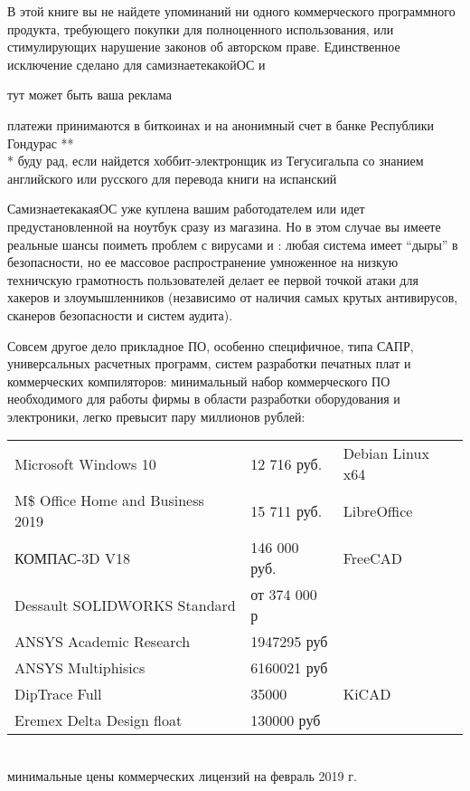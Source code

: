 \clearpage
{}

В этой книге вы не найдете упоминаний ни одного коммерческого программного
продукта, требующего покупки для полноценного использования, или
стимулирующих нарушение законов об авторском праве. Единственное исключение
сделано для самизнаетекакойОС и 
\begin{framed}
\begin{center}
тут может быть ваша реклама
\end{center}
{\tiny * платежи принимаются в биткоинах и на анонимный счет в банке
Республики Гондурас **}\\
{\tiny ** буду рад, если найдется хоббит-электронщик из Тегусигальпа со знанием
английского или русского для перевода книги на испанский}
\end{framed}

\clearpage\noindent
СамизнаетекакаяОС уже куплена вашим работодателем
или идет предустановленной на ноутбук сразу из магазина. Но в этом случае вы
имеете реальные шансы поиметь проблем с вирусами и : любая система
имеет ``дыры'' в безопасности, но ее массовое распространение умноженное на
низкую техничскую грамотность пользователей делает ее первой точкой атаки для
хакеров и злоумышленников (независимо от наличия самых крутых
антивирусов, сканеров безопасности и систем аудита).

Совсем другое дело прикладное ПО, особенно специфичное, типа САПР, универсальных
расчетных программ, систем разработки печатных плат и коммерческих компиляторов:
минимальный набор коммерческого ПО необходимого для работы фирмы в области
разработки оборудования и электроники, легко превысит пару миллионов рублей:

\bigskip\noindent
\begin{tabular}{l l l}
Microsoft Windows 10 & 12 716 руб. & Debian Linux x64 \\
M\$ Office Home and Business 2019 & 15 711 руб. & LibreOffice \\
КОМПАС-3D V18 & 146 000 руб. & FreeCAD \\
Dessault SOLIDWORKS Standard & от 374 000 р &\\
ANSYS Academic Research& 1947295 руб &\\
ANSYS Multiphisics & 6160021 руб &\\
DipTrace Full & 35000  & KiCAD \\
Eremex Delta Design float & 130000 руб &\\
\end{tabular}\\
{\small * минимальные цены коммерческих лицензий на февраль 2019 г.}
